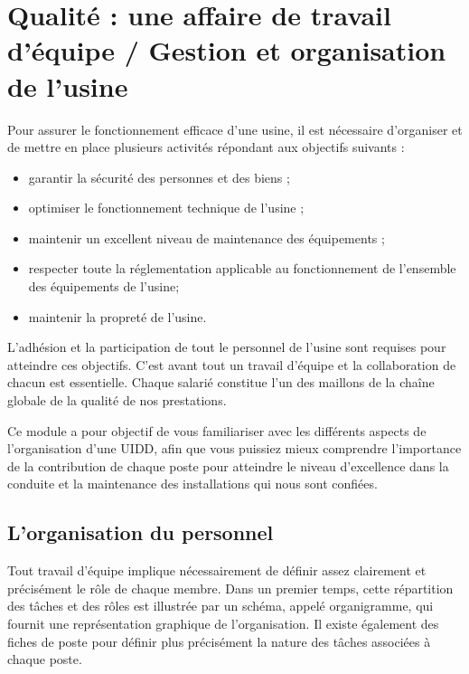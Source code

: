 \chapter{Qualité : une affaire de travail d'équipe / Gestion et organisation de l'usine}

Pour assurer le fonctionnement efficace d’une usine, il est nécessaire d’organiser et de mettre en place plusieurs activités répondant aux objectifs suivants :

\begin{itemize}
\item garantir la sécurité des personnes et des biens ;
\item optimiser le fonctionnement technique de l’usine ;
\item maintenir un excellent niveau de maintenance des équipements ;
\item respecter toute la réglementation applicable au fonctionnement de l’ensemble des équipements de l’usine;
\item maintenir la propreté de l’usine.

\end{itemize} 

L’adhésion et la participation de tout le personnel de l’usine sont requises pour atteindre ces objectifs. C’est avant tout un travail d’équipe et la collaboration de chacun est essentielle. Chaque salarié constitue l’un des maillons de la chaîne globale de la qualité de nos prestations.
\vspace{0.3cm} 

Ce module a pour objectif de vous familiariser avec les différents aspects de l’organisation d’une UIDD, afin que vous puissiez mieux comprendre l’importance de la contribution de chaque poste pour atteindre le niveau d’excellence dans la conduite et la maintenance des installations qui nous sont confiées.





 
\section{L’organisation du personnel}

Tout travail d’équipe implique nécessairement de définir assez clairement et précisément le rôle de chaque membre. Dans un premier temps, cette répartition des tâches et des rôles est illustrée par un schéma, appelé organigramme, qui fournit une représentation graphique de l’organisation. Il existe également des fiches de poste pour définir plus précisément la nature des tâches associées à chaque poste.
\vspace{0.3cm} 

